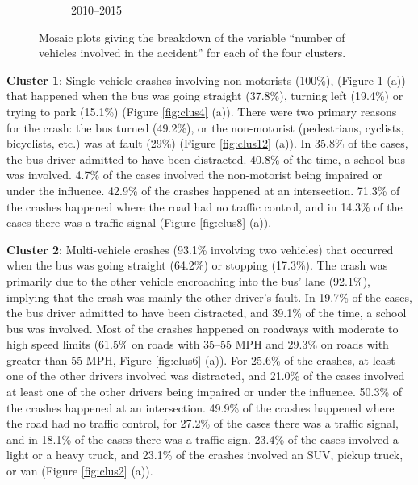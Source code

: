 \begin{figure}[t]
\begin{subfigure}[t]{.5\textwidth}
                \caption{2010--2015}
        \end{subfigure}
        \caption{Mosaic plots giving the breakdown of the variable ``number of vehicles involved in the accident'' for each of the four clusters.}
 \label{fig:clus10}
\end{figure}

\noindent
\textbf{Cluster 1}: Single vehicle crashes involving non-motorists (100\%), (Figure \ref{fig:clus10} (a)) that happened when the bus was going straight (37.8\%), turning left (19.4\%) or trying to park (15.1\%) (Figure \ref{fig:clus4} (a)). There were two primary reasons for the crash: the bus turned (49.2\%), or the non-motorist (pedestrians, cyclists, bicyclists, etc.) was at fault (29\%) (Figure \ref{fig:clus12} (a)). In 35.8\% of the cases, the bus driver admitted to have been distracted. 40.8\% of the time, a school bus was involved. 4.7\% of the cases involved the non-motorist being impaired or under the influence. 42.9\% of the crashes happened at an intersection. 71.3\% of the crashes happened where the road had no traffic control, and in 14.3\% of the cases there was a traffic signal (Figure \ref{fig:clus8} (a)). 

\noindent
\textbf{Cluster 2}: Multi-vehicle crashes (93.1\% involving two vehicles) that occurred when the bus was going straight (64.2\%) or stopping (17.3\%). The crash was primarily due to the other vehicle encroaching into the bus' lane (92.1\%), implying that the crash was mainly the other driver's fault. In 19.7\% of the cases, the bus driver admitted to have been distracted, and 39.1\% of the time, a school bus was involved. Most of the crashes happened on roadways with moderate to high speed limits (61.5\% on roads with 35--55 MPH and 29.3\% on roads with greater than 55 MPH, Figure \ref{fig:clus6} (a)). For 25.6\% of the crashes, at least one of the other drivers involved was distracted, and 21.0\% of the cases involved at least one of the other drivers being impaired or under the influence. 50.3\% of the crashes happened at an intersection. 49.9\% of the crashes happened where the road had no traffic control, for 27.2\% of the cases there was a traffic signal, and in 18.1\% of the cases there was a traffic sign. 23.4\% of the cases involved a light or a heavy truck, and 23.1\% of the crashes involved an SUV, pickup truck, or van (Figure \ref{fig:clus2} (a)).

